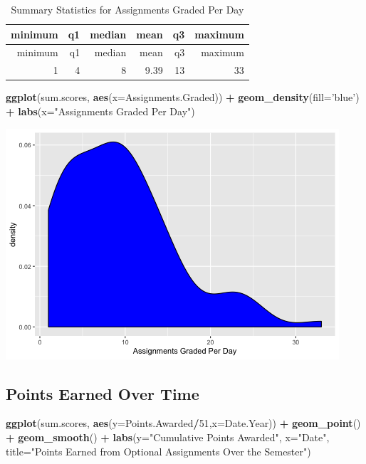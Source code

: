 \documentclass[]{article}
\newenvironment{Shaded}{\begin{snugshade}}{\end{snugshade}}
\newcommand{\KeywordTok}[1]{\textcolor[rgb]{0.13,0.29,0.53}{\textbf{#1}}}
\newcommand{\DataTypeTok}[1]{\textcolor[rgb]{0.13,0.29,0.53}{#1}}
\newcommand{\DecValTok}[1]{\textcolor[rgb]{0.00,0.00,0.81}{#1}}
\newcommand{\StringTok}[1]{\textcolor[rgb]{0.31,0.60,0.02}{#1}}
\newcommand{\OperatorTok}[1]{\textcolor[rgb]{0.81,0.36,0.00}{\textbf{#1}}}
\newcommand{\NormalTok}[1]{#1}
\begin{document}
\begin{longtable}[]{@{}rrrrrr@{}}
\caption{Summary Statistics for Assignments Graded Per
Day}\tabularnewline
\toprule
minimum & q1 & median & mean & q3 & maximum\tabularnewline
\midrule
\endfirsthead
\toprule
minimum & q1 & median & mean & q3 & maximum\tabularnewline
\midrule
\endhead
1 & 4 & 8 & 9.39 & 13 & 33\tabularnewline
\bottomrule
\end{longtable}

\begin{Shaded}
\begin{Highlighting}[]
\KeywordTok{ggplot}\NormalTok{(sum.scores, }\KeywordTok{aes}\NormalTok{(}\DataTypeTok{x=}\NormalTok{Assignments.Graded)) }\OperatorTok{+}
\StringTok{  }\KeywordTok{geom_density}\NormalTok{(}\DataTypeTok{fill=}\StringTok{'blue'}\NormalTok{) }\OperatorTok{+}
\StringTok{  }\KeywordTok{labs}\NormalTok{(}\DataTypeTok{x=}\StringTok{"Assignments Graded Per Day"}\NormalTok{)}
\end{Highlighting}
\end{Shaded}

\includegraphics{figures/assignments-graded-2.png}

\subsection{Points Earned Over Time}\label{points-earned-over-time}

\begin{Shaded}
\begin{Highlighting}[]
\KeywordTok{ggplot}\NormalTok{(sum.scores, }\KeywordTok{aes}\NormalTok{(}\DataTypeTok{y=}\NormalTok{Points.Awarded}\OperatorTok{/}\DecValTok{51}\NormalTok{,}\DataTypeTok{x=}\NormalTok{Date.Year)) }\OperatorTok{+}
\StringTok{  }\KeywordTok{geom_point}\NormalTok{() }\OperatorTok{+}
\StringTok{  }\KeywordTok{geom_smooth}\NormalTok{() }\OperatorTok{+}
\StringTok{  }\KeywordTok{labs}\NormalTok{(}\DataTypeTok{y=}\StringTok{"Cumulative Points Awarded"}\NormalTok{,}
       \DataTypeTok{x=}\StringTok{"Date"}\NormalTok{,}
       \DataTypeTok{title=}\StringTok{"Points Earned from Optional Assignments Over the Semester"}\NormalTok{)}
\end{Highlighting}
\end{Shaded}
\end{document}
